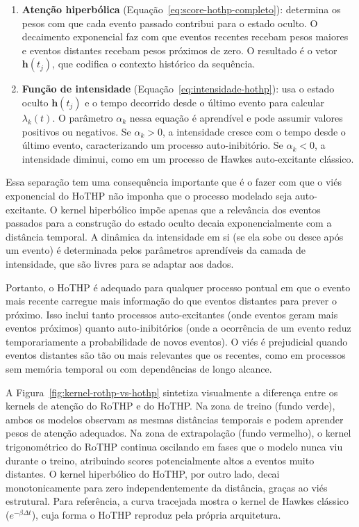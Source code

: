 \begin{enumerate}
    \item \textbf{Atenção hiperbólica} (Equação~\ref{eq:score-hothp-completo}): determina os pesos com que cada evento passado contribui para o estado oculto. O decaimento exponencial faz com que eventos recentes recebam pesos maiores e eventos distantes recebam pesos próximos de zero. O resultado é o vetor $\mathbf{h}(t_j)$, que codifica o contexto histórico da sequência.

    \item \textbf{Função de intensidade} (Equação~\ref{eq:intensidade-hothp}): usa o estado oculto $\mathbf{h}(t_j)$ e o tempo decorrido desde o último evento para calcular $\lambda_k(t)$. O parâmetro $\alpha_k$ nessa equação é aprendível e pode assumir valores positivos ou negativos. Se $\alpha_k > 0$, a intensidade cresce com o tempo desde o último evento, caracterizando um processo auto-inibitório. Se $\alpha_k < 0$, a intensidade diminui, como em um processo de Hawkes auto-excitante clássico.
\end{enumerate}

Essa separação tem uma consequência importante que é o fazer com que o viés exponencial do HoTHP não imponha que o processo modelado seja auto-excitante. O kernel hiperbólico impõe apenas que a relevância dos eventos passados para a construção do estado oculto decaia exponencialmente com a distância temporal. A dinâmica da intensidade em si (se ela sobe ou desce após um evento) é determinada pelos parâmetros aprendíveis da camada de intensidade, que são livres para se adaptar aos dados.

Portanto, o HoTHP é adequado para qualquer processo pontual em que o evento mais recente carregue mais informação do que eventos distantes para prever o próximo. Isso inclui tanto processos auto-excitantes (onde eventos geram mais eventos próximos) quanto auto-inibitórios (onde a ocorrência de um evento reduz temporariamente a probabilidade de novos eventos). O viés é prejudicial quando eventos distantes são tão ou mais relevantes que os recentes, como em processos sem memória temporal ou com dependências de longo alcance.

A Figura~\ref{fig:kernel-rothp-vs-hothp} sintetiza visualmente a diferença entre os kernels de atenção do RoTHP e do HoTHP. Na zona de treino (fundo verde), ambos os modelos observam as mesmas distâncias temporais e podem aprender pesos de atenção adequados. Na zona de extrapolação (fundo vermelho), o kernel trigonométrico do RoTHP continua oscilando em fases que o modelo nunca viu durante o treino, atribuindo scores potencialmente altos a eventos muito distantes. O kernel hiperbólico do HoTHP, por outro lado, decai monotonicamente para zero independentemente da distância, graças ao viés estrutural. Para referência, a curva tracejada mostra o kernel de Hawkes clássico ($e^{-\beta \Delta t}$), cuja forma o HoTHP reproduz pela própria arquitetura.

